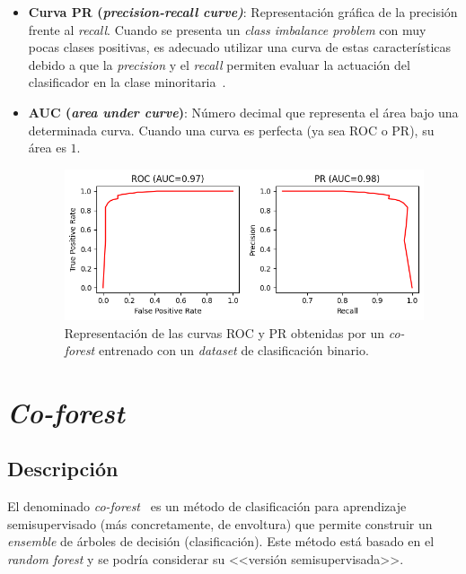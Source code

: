 \begin{itemize}
	\item \textbf{Curva PR (\textit{precision-recall curve)}}:  Representación gráfica de la precisión frente al \textit{recall}. Cuando se presenta un \textit{class imbalance problem} con muy pocas clases positivas, es adecuado utilizar una curva de estas características debido a que la \textit{precision} y el \textit{recall} permiten evaluar la actuación del clasificador en la clase minoritaria~\cite{imbalanced2013Haibo}.
	
	\item \textbf{AUC (\textit{area under curve})}: Número decimal que representa el área bajo una determinada curva. Cuando una curva es perfecta (ya sea ROC o PR), su área es $1$.
	
	\begin{figure}[h]
		\caption[AUC curvas ROC y PR]{Representación de las curvas ROC y PR obtenidas por un \textit{co-forest} entrenado con un \textit{dataset} de clasificación binario.}
		\label{img:curva_roc_pr}
		\centering
		\includegraphics[scale=0.7]{../img/memoria/3_auc_roc_pr}
	\end{figure}
	
\end{itemize}

\section{\textit{Co-forest}}

\subsection{Descripción}

El denominado \textit{co-forest}~\cite{originalCoForest2007} es un método de clasificación para aprendizaje semisupervisado (más concretamente, de envoltura) que permite construir un \textit{ensemble} de árboles de decisión (clasificación). Este método está basado en el \textit{random forest} y se podría considerar su <<versión semisupervisada>>. 

